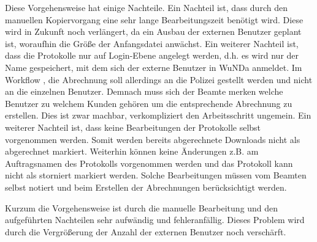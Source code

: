 Diese Vorgehensweise hat einige Nachteile. Ein Nachteil ist, dass durch den manuellen Kopiervorgang eine sehr lange Bearbeitungszeit benötigt wird. Diese wird in Zukunft noch verlängert, da ein Ausbau der externen Benutzer geplant ist, woraufhin die Größe der Anfangsdatei anwächst.
Ein weiterer Nachteil ist, dass die Protokolle nur auf Login-Ebene angelegt werden, d.h. es wird nur der Name gespeichert, mit dem sich der externe Benutzer in \ac{WuNDa} anmeldet.
Im Workflow , die Abrechnung soll allerdings an die Polizei gestellt werden und nicht an die einzelnen Benutzer. Demnach muss sich der Beamte merken welche Benutzer zu welchem Kunden gehören um die entsprechende Abrechnung zu erstellen. Dies ist zwar machbar, verkompliziert den Arbeitsschritt ungemein.
Ein weiterer Nachteil ist, dass keine Bearbeitungen der Protokolle selbst vorgenommen werden. Somit werden bereits abgerechnete Downloads nicht als abgerechnet markiert. Weiterhin können keine Änderungen z.B. am Auftragsnamen des Protokolls vorgenommen werden und das Protokoll kann nicht als storniert markiert werden. Solche Bearbeitungen müssen vom Beamten selbst notiert und beim Erstellen der Abrechnungen berücksichtigt werden.

Kurzum die Vorgehensweise ist durch die manuelle Bearbeitung und den aufgeführten Nachteilen sehr aufwändig und fehleranfällig. Dieses Problem wird durch die Vergrößerung der Anzahl der externen Benutzer noch verschärft.



%









